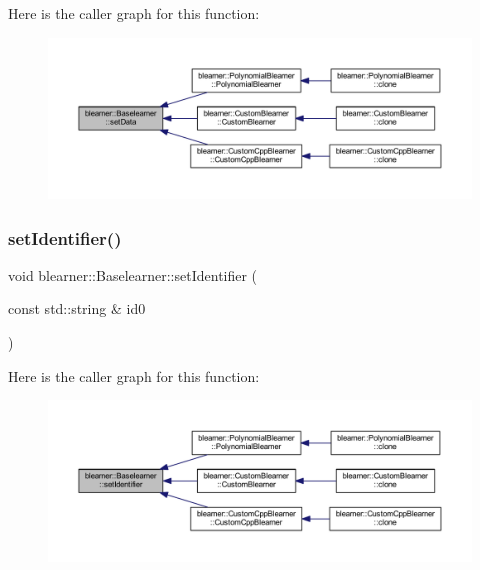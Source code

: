 Here is the caller graph for this function\+:\nopagebreak
\begin{figure}[H]
\begin{center}
\leavevmode
\includegraphics[width=350pt]{classblearner_1_1_baselearner_a29122c6125ef6ec03ad84602b3e2d0d4_icgraph}
\end{center}
\end{figure}
\mbox{\label{classblearner_1_1_baselearner_a6669906a481cbdd516dce8df6f6e5b76}} 
\subsubsection{\texorpdfstring{set\+Identifier()}{setIdentifier()}}
{\footnotesize\ttfamily void blearner\+::\+Baselearner\+::set\+Identifier (\begin{DoxyParamCaption}\item[{const std\+::string \&}]{id0 }\end{DoxyParamCaption})}

Here is the caller graph for this function\+:\nopagebreak
\begin{figure}[H]
\begin{center}
\leavevmode
\includegraphics[width=350pt]{classblearner_1_1_baselearner_a6669906a481cbdd516dce8df6f6e5b76_icgraph}
\end{center}
\end{figure}
\mbox{\label{classblearner_1_1_baselearner_a40e03ad070b9a03aae706d9ee8094b80}} 
